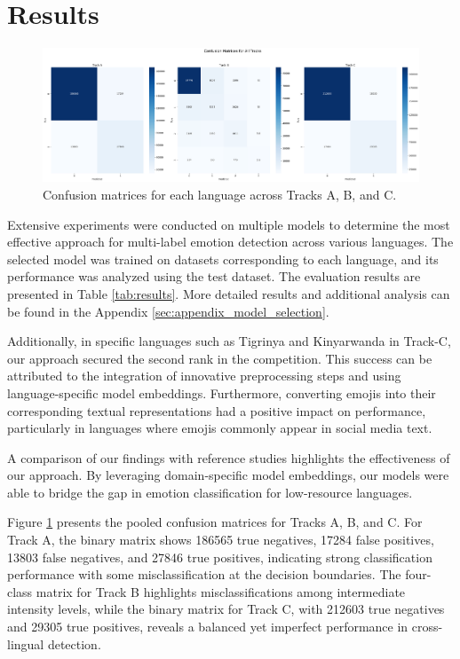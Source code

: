 \section{Results}
\begin{figure}[t]
    \centering
    \includegraphics[width=1.7\columnwidth]{images/confusion_matrices_all_tracks.png}
    \caption{Confusion matrices for each language across Tracks A, B, and C.}
    \label{fig:confusion_matrices}
\end{figure}
Extensive experiments were conducted on multiple models to determine the most effective approach for multi-label emotion detection across various languages. The selected model was trained on datasets corresponding to each language, and its performance was analyzed using the test dataset. The evaluation results are presented in Table \ref{tab:results}. More detailed results and additional analysis can be found in the Appendix \ref{sec:appendix_model_selection}.

Additionally, in specific languages such as Tigrinya and Kinyarwanda in Track-C, our approach secured the second rank in the competition. This success can be attributed to the integration of innovative preprocessing steps and using language-specific model embeddings. Furthermore, converting emojis into their corresponding textual representations had a positive impact on performance, particularly in languages where emojis commonly appear in social media text.

A comparison of our findings with reference studies \cite{muhammad2025brighterbridginggaphumanannotated} highlights the effectiveness of our approach. By leveraging domain-specific model embeddings, our models were able to bridge the gap in emotion classification for low-resource languages.

Figure \ref{fig:confusion_matrices} presents the pooled confusion matrices for Tracks A, B, and C. For Track A, the binary matrix shows 186565 true negatives, 17284 false positives, 13803 false negatives, and 27846 true positives, indicating strong classification performance with some misclassification at the decision boundaries. The four-class matrix for Track B highlights misclassifications among intermediate intensity levels, while the binary matrix for Track C, with 212603 true negatives and 29305 true positives, reveals a balanced yet imperfect performance in cross-lingual detection.

